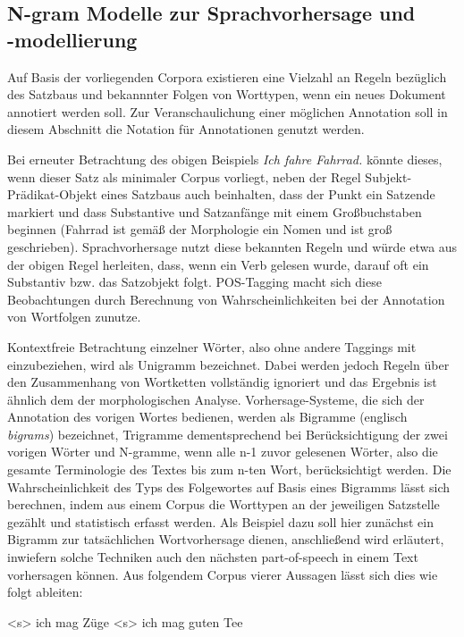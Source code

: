 \documentclass[12pt]{report}
\begin{document}
\subsection{N-gram Modelle zur Sprachvorhersage und\\ -modellierung}
Auf Basis der vorliegenden Corpora existieren eine Vielzahl an Regeln bezüglich des Satzbaus und bekannnter Folgen von Worttypen, wenn ein neues Dokument annotiert werden soll. Zur Veranschaulichung einer möglichen Annotation soll in diesem Abschnitt die Notation \cite{clw7} für Annotationen genutzt werden.

Bei erneuter Betrachtung des obigen Beispiels \textit{\glqq  Ich fahre Fahrrad.\grqq{}} könnte dieses, wenn dieser Satz als minimaler Corpus vorliegt, neben der Regel Subjekt-Prädikat-Objekt eines Satzbaus auch beinhalten, dass der Punkt ein Satzende markiert und dass Substantive und Satzanfänge mit einem Großbuchstaben beginnen (\glqq  Fahrrad\grqq{} ist gemäß der Morphologie ein Nomen und ist groß geschrieben). Sprachvorhersage nutzt diese bekannten Regeln und würde etwa aus der obigen Regel herleiten, dass, wenn ein Verb gelesen wurde, darauf oft ein Substantiv bzw. das Satzobjekt folgt. POS-Tagging macht sich diese Beobachtungen durch Berechnung von Wahrscheinlichkeiten bei der Annotation von Wortfolgen zunutze. 

Kontextfreie Betrachtung einzelner Wörter, also ohne andere Taggings mit einzubeziehen, wird als Unigramm bezeichnet. Dabei werden jedoch Regeln über den Zusammenhang von Wortketten vollständig ignoriert und das Ergebnis ist ähnlich dem der morphologischen Analyse. Vorhersage-Systeme, die sich der Annotation des vorigen Wortes bedienen, werden als Bigramme (englisch \textit{bigrams}) bezeichnet, Trigramme dementsprechend bei Berücksichtigung der zwei vorigen Wörter und N-gramme, wenn alle n-1 zuvor gelesenen Wörter, also die gesamte Terminologie des Textes bis zum n-ten Wort, berücksichtigt werden.
Die Wahrscheinlichkeit des Typs des Folgewortes auf Basis eines Bigramms lässt sich berechnen, indem aus einem Corpus die Worttypen an der jeweiligen Satzstelle gezählt und statistisch erfasst werden. 
Als Beispiel dazu soll hier zunächst ein Bigramm zur tatsächlichen Wortvorhersage dienen, anschließend wird erläutert, inwiefern solche Techniken auch den nächsten part-of-speech in einem Text vorhersagen können. Aus folgendem Corpus vierer Aussagen lässt sich dies wie folgt ableiten:
\\ \tt

<s> ich mag Züge <s> ich mag guten Tee 
\end{document}
